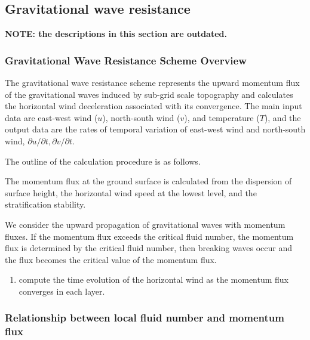 \hypertarget{gravitational-wave-resistance}{%
\subsection{Gravitational wave
resistance}\label{gravitational-wave-resistance}}

\textbf{NOTE: the descriptions in this section are outdated.}

\hypertarget{gravitational-wave-resistance-scheme-overview}{%
\subsubsection{Gravitational Wave Resistance Scheme
Overview}\label{gravitational-wave-resistance-scheme-overview}}

The gravitational wave resistance scheme represents the upward momentum
flux of the gravitational waves induced by sub-grid scale topography and
calculates the horizontal wind deceleration associated with its
convergence. The main input data are east-west wind (\(u\)), north-south
wind (\(v\)), and temperature (\(T\)), and the output data are the rates
of temporal variation of east-west wind and north-south wind,
\(\partial u/\partial t, \partial v/\partial t\).

The outline of the calculation procedure is as follows.

The momentum flux at the ground surface is calculated from the
dispersion of surface height, the horizontal wind speed at the lowest
level, and the stratification stability.

We consider the upward propagation of gravitational waves with momentum
fluxes. If the momentum flux exceeds the critical fluid number, the
momentum flux is determined by the critical fluid number, then breaking
waves occur and the flux becomes the critical value of the momentum
flux.

\begin{enumerate}
\def\labelenumi{\arabic{enumi}.}
\setcounter{enumi}{2}
\tightlist
\item
  compute the time evolution of the horizontal wind as the momentum flux
  converges in each layer.
\end{enumerate}

\hypertarget{relationship-between-local-fluid-number-and-momentum-flux}{%
\subsubsection{Relationship between local fluid number and momentum
flux}\label{relationship-between-local-fluid-number-and-momentum-flux}}

